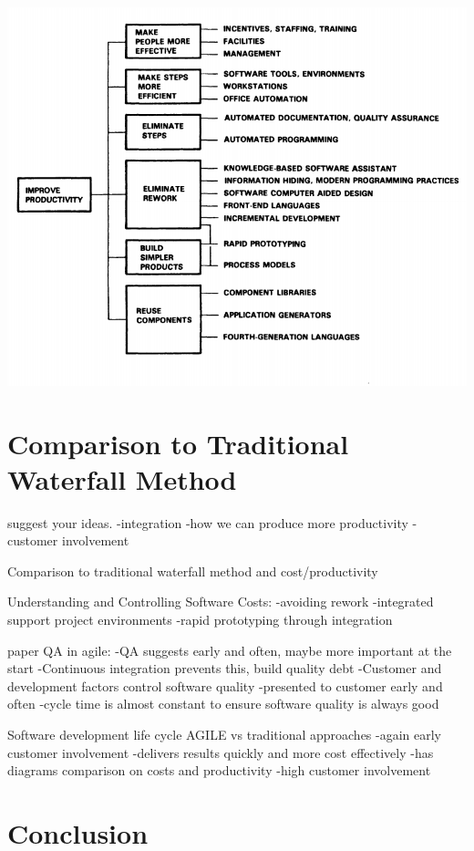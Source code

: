 \documentclass{scrartcl}
\begin{document}
\includegraphics{ImprovingProductivity.PNG}

\section{Comparison to Traditional Waterfall Method}
suggest your ideas. 
-integration
-how we can produce more productivity
-customer involvement 
 
Comparison to traditional waterfall method and cost/productivity



Understanding and Controlling Software Costs:
-avoiding rework
-integrated support project environments 
-rapid prototyping through integration

paper QA in agile:
-QA suggests early and often, maybe more important at the start 
-Continuous integration prevents this, build quality debt
-Customer and development factors control software quality
-presented to customer early and often
-cycle time is almost constant to ensure software quality is always good


Software development life cycle AGILE vs traditional approaches
-again early customer involvement 
-delivers results quickly and more cost effectively 
-has diagrams comparison on costs and productivity 
-high customer involvement 




\section{Conclusion}
\end{document}
